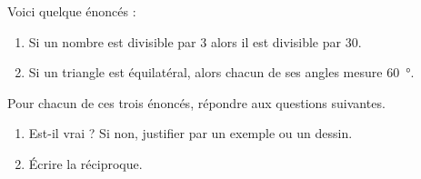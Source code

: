 
\begin{exercice}\label{exosmath-0902}

    Voici quelque énoncés :
    \begin{enumerate}
        \item
            Si un nombre est divisible par \( 3\) alors il est divisible par \( 30\).
        \item
            Si un triangle est équilatéral, alors chacun de ses angles mesure \SI{60}{\degree}.
    \end{enumerate}
    
    Pour chacun de ces trois énoncés, répondre aux questions suivantes.
    \begin{enumerate}
        \item
            Est-il vrai ? Si non, justifier par un exemple ou un dessin.
        \item
            Écrire la réciproque.
    \end{enumerate}


\end{exercice}

